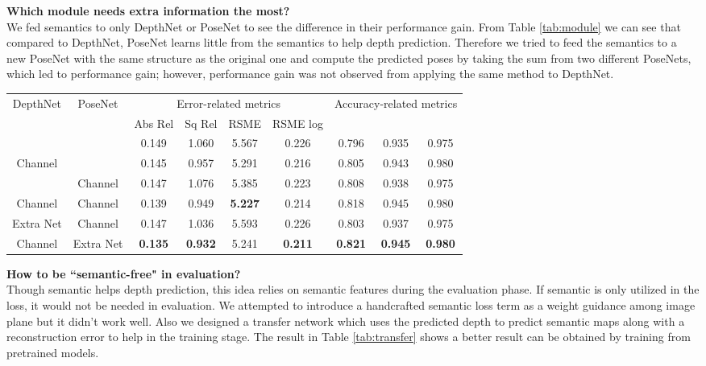 \documentclass[10pt,twocolumn]{article}
\newcommand{\Noindent}{\vspace{2pt} \noindent}
\newcommand{\parquest}[1]{\Noindent\textbf{#1?\\}}
\begin{document}
\parquest{Which module needs extra information the most} We fed semantics to only DepthNet or PoseNet to see the difference in their performance gain. From Table \ref{tab:module} we can see that compared to DepthNet, PoseNet learns little from the semantics to help depth prediction. Therefore we tried to feed the semantics to a new PoseNet with the same structure as the original one and compute the predicted poses by taking the sum from two different PoseNets, which led to performance gain; however, performance gain was not observed from applying the same method to DepthNet.

\begin{table*}[htbp]
\centering
\begin{tabular}{ c c|| c c c c|c c c  }
 \hline
  \multirow{2}{*}{DepthNet} & 
  \multirow{2}{*}{PoseNet} & \multicolumn{4}{c|}{Error-related metrics} & \multicolumn{3}{c}{Accuracy-related metrics}\\
  
   &  & Abs Rel & Sq Rel & RSME & RSME log &  &  & \\
   
 \hline
   &  &   0.149 &    1.060 &    5.567    & 0.226 & 0.796 & 0.935 & 0.975 \\
   
  Channel &    & 0.145 & 0.957 & 5.291 & 0.216 & 0.805 & 0.943 & 0.980 \\
   
   &  Channel  & 0.147 & 1.076 & 5.385 & 0.223 & 0.808 & 0.938 & 0.975 \\

  Channel & Channel   & 0.139& 0.949 & \textbf{5.227} & 0.214 & 0.818 & 0.945 & 0.980 \\
  Extra Net & Channel   & 0.147 & 1.036 & 5.593 & 0.226 & 0.803 & 0.937 & 0.975 \\
  Channel & Extra Net & \textbf{0.135} & \textbf{0.932} & 5.241 & \textbf{0.211} & \textbf{0.821} & \textbf{0.945} & \textbf{0.980} \\
 \hline
\end{tabular}
\caption{Each module's contribution toward performance gain from semantics. (Scale normalization was used.)}\label{tab:module}
\end{table*}

\parquest{How to be ``semantic-free" in evaluation}Though semantic helps depth prediction, this idea relies on semantic features during the evaluation phase. If semantic is only utilized in the loss, it would not be needed in evaluation. We attempted to introduce a handcrafted semantic loss term as a weight guidance among image plane but it didn't work well. Also we designed a transfer network which uses the predicted depth to predict semantic maps along with a reconstruction error to help in the training stage. The result in Table \ref{tab:transfer} shows a better result can be obtained by training from pretrained models.
\end{document}
